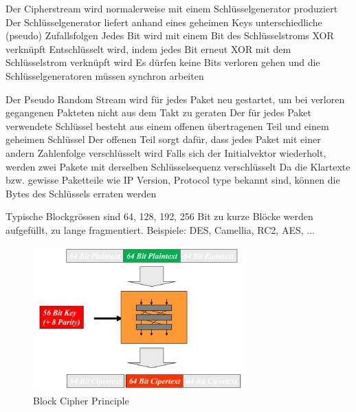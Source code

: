 \documentclass[ngerman,a4paper,12pt]{scrreprt}
\begin{document}

\ul
	\li Der Cipherstream wird normalerweise mit einem Schlüsselgenerator produziert
	\li Der Schlüsselgenerator liefert anhand eines geheimen Keys unterschiedliche (pseudo) Zufallsfolgen
	\li Jedes Bit wird mit einem Bit des Schlüsselstroms XOR verknüpft
	\li Entschlüsselt wird, indem jedes Bit erneut XOR mit dem Schlüsselstrom verknüpft wird
	\li Es dürfen keine Bits verloren gehen und die Schlüsselgeneratoren müssen synchron arbeiten
\ulE

\ul
	\li Der Pseudo Random Stream wird für jedes Paket neu gestartet, um bei verloren gegangenen Pakteten nicht aus dem Takt zu geraten
	\li Der für jedes Paket verwendete Schlüssel besteht aus  einem offenen übertragenen Teil und einem geheimen Schlüssel
	\li Der offenen Teil sorgt dafür, dass jedes Paket mit einer andern Zahlenfolge verschlüsselt wird
	\li Falls sich der Initialvektor wiederholt, werden zwei Pakete mit derselben Schlüsselsequenz verschlüsselt
	\li Da die Klartexte bzw. gewisse Paketteile wie IP Version, Protocol type bekannt sind, können die Bytes des Schlüssels erraten werden
\ulE

\ul
	\li Typische Blockgrössen sind 64, 128, 192, 256 Bit
	\li zu kurze Blöcke werden aufgefüllt, zu lange fragmentiert.
	\li Beispiele: DES, Camellia, RC2, AES, ...
\ulE
\begin{figure}[H]
	\centering
	\includegraphics[width=\textwidth]{img/V5.4.jpg}
	\caption{Block Cipher Principle}
	\label{}
\end{figure}
\end{document}
